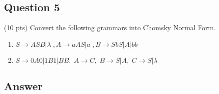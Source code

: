 \newpage
\subsection*{Question 5}

\noindent (10 pts) Convert the following grammars into Chomsky Normal Form.
    
    \begin{enumerate}[label={(\alph*)}]
        \item $S \rightarrow ASB|\lambda\;, A \rightarrow aAS|a\;, B \rightarrow SbS|A|bb$
        \item $S \rightarrow 0A0|1B1|BB,\; A \rightarrow C,\; B \rightarrow S|A, \; C \rightarrow S|\lambda$
    \end{enumerate}


\subsection*{Answer}

